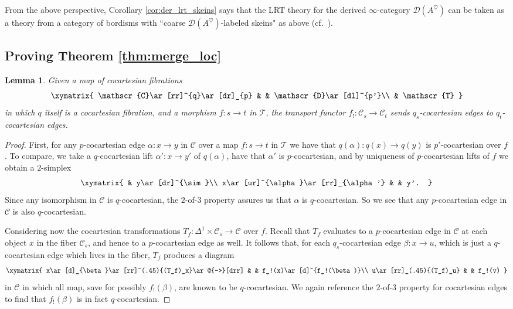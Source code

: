 \documentclass[reqno]{amsart}
\newtheorem{lemma}{Lemma}[section]
\theoremstyle{definition}
\newcommand{\msc}[1]{\mathscr{#1}}
\renewcommand{\1}{\mathbf{1}}
\begin{document}
From the above perspective, Corollary \ref{cor:der_lrt_skeins} says that the LRT theory for the derived $\infty$-category $\msc{D}(A^{\heartsuit})$ can be taken as a theory from a category of bordisms with ``coarse $\msc{D}(A^{\heartsuit})$-labeled skeins" as above (cf.\ \cite{derenzietal23,brownhaioun,costantinoetal,costantinoetalII}).

\subsection{Proving Theorem \ref{thm:merge_loc}}
\label{sect:proof_merge_bord}

\begin{lemma}\label{lem:3779}
Given a map of cocartesian fibrations
\[
\xymatrix{
\msc{C}\ar[rr]^{q}\ar[dr]_{p} & & \msc{D}\ar[dl]^{p'}\\
 & \msc{T}
}
\]
in which $q$ itself is a cocartesian fibration, and a morphism $f:s\to t$ in $\msc{T}$, the transport functor $f_!:\msc{C}_s\to \msc{C}_t$ sends $q_s$-cocartesian edges to $q_t$-cocartesian edges.
\end{lemma}

\begin{proof}
First, for any $p$-cocartesian edge $\alpha:x\to y$ in $\msc{C}$ over a map $f:s\to t$ in $\msc{T}$ we have that $q(\alpha):q(x)\to q(y)$ is $p'$-cocartesian over $f$. To compare, we take a $q$-cocartesian lift $\alpha':x\to y'$ of $q(\alpha)$, have that $\alpha'$ is $p$-cocartesian, and by uniqueness of $p$-cocartesian lifts of $f$ we obtain a $2$-simplex
\[
\xymatrix{
	& y\ar[dr]^{\sim}\\
x\ar[ur]^{\alpha}\ar[rr]_{\alpha'} & & y'.
}
\]
Since any isomorphism in $\msc{C}$ is $q$-cocartesian, the $2$-of-$3$ property \cite[\href{https://kerodon.net/tag/01TS}{01TS}]{kerodon} assures us that $\alpha$ is $q$-cocartesian.  So we see that any $p$-cocartesian edge in $\msc{C}$ is also $q$-cocartesian.

Considering now the cocartesian transformations $T_f:\Delta^1\times\msc{C}_s\to \msc{C}$ over $f$. Recall that $T_f$ evaluates to a $p$-cocartesian edge in $\msc{C}$ at each object $x$ in the fiber $\msc{C}_s$, and hence to a $p$-cocartesian edge as well.  It follows that, for each $q_s$-cocartesian edge $\beta:x\to u$, which is just a $q$-cocartesian edge which lives in the fiber, $T_f$ produces a diagram
\[
\xymatrix{
x\ar[d]_{\beta}\ar[rr]^(.45){(T_f)_x}\ar@{-->}[drr] & & f_!(x)\ar[d]^{f_!(\beta)}\\
u\ar[rr]_(.45){(T_f)_u} & & f_!(v)
}
\]
in $\msc{C}$ in which all map, save for possibly $f_!(\beta)$, are known to be $q$-cocartesian. We again reference the $2$-of-$3$ property for cocartesian edges to find that $f_!(\beta)$ is in fact $q$-cocartesian.
\end{proof}
\end{document}
